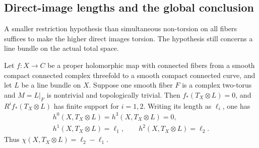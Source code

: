 \documentclass[11pt]{article}
\numberwithin{equation}{section}
\begin{document}
\subsection{Direct-image lengths and the global conclusion}

A smaller restriction hypothesis than simultaneous non-torsion
on all fibers suffices to make the higher direct images torsion.
The hypothesis still concerns a line bundle on the actual total
space.

\begin{proposition}\label{ad:prop:one-fiber-lengths}
Let $f:X\to C$ be a proper holomorphic map with connected fibers
from a smooth compact connected complex threefold to a smooth
compact connected curve, and let $L$ be a line bundle on $X$.
Suppose one smooth fiber $F$ is a complex two-torus and $M=L|_F$
is nontrivial and topologically trivial. Then $f_*(T_X\otimes L)=0$, and
$R^if_*(T_X\otimes L)$ has finite support for $i=1,2$.
Writing its length as $\ell_i$, one has
\[
 \begin{gathered}
 h^0(X,T_X\otimes L)=h^3(X,T_X\otimes L)=0,\\
 h^1(X,T_X\otimes L)=\ell_1,\qquad
 h^2(X,T_X\otimes L)=\ell_2.
 \end{gathered}
\]
Thus $\chi(X,T_X\otimes L)=\ell_2-\ell_1$.
\end{proposition}
\end{document}
